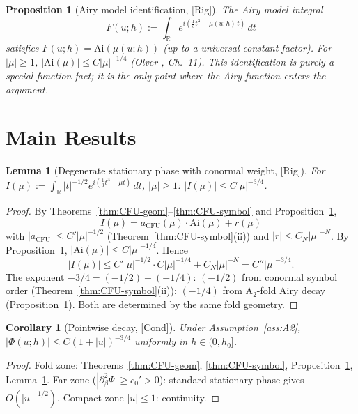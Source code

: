 \documentclass[12pt,a4paper]{amsart}
\newtheorem{lemma}[theorem]{Lemma}
\newtheorem{proposition}[theorem]{Proposition}
\newtheorem{corollary}[theorem]{Corollary}
\theoremstyle{definition}
\theoremstyle{remark}
\newcommand{\Rig}{\textup{[Rig]}}
\newcommand{\Cond}{\textup{[Cond]}}
\begin{document}
\begin{proposition}[Airy model identification, \Rig]
\label{prop:airy-id}
The Airy model integral
\[
  F(u;h) :=
  \int_\mathbb{R}
  e^{i(\frac{1}{3}t^3-\mu(u;h)\,t)}
  \,dt
\]
satisfies $F(u;h)=\mathrm{Ai}(\mu(u;h))$
(up to a universal constant factor).
For $|\mu|\ge 1$,
$|\mathrm{Ai}(\mu)|\le C|\mu|^{-1/4}$
(Olver \cite{Olver1974}, Ch.~11).
This identification is purely a special function fact;
it is the only point where the Airy function enters
the argument.
\end{proposition}

\section{Main Results}
\label{sec:results}

\begin{lemma}[Degenerate stationary phase
  with conormal weight, \Rig]
\label{lem:degenerate-phase}
For $I(\mu):=\int_\mathbb{R}|t|^{-1/2}
e^{i(\frac{1}{3}t^3-\mu t)}\,dt$,
$|\mu|\ge 1$:
$|I(\mu)|\le C|\mu|^{-3/4}$.
\end{lemma}

\begin{proof}
By Theorems~\ref{thm:CFU-geom}--\ref{thm:CFU-symbol}
and Proposition~\ref{prop:airy-id},
\[
  I(\mu) = a_{\mathrm{CFU}}(\mu)\cdot\mathrm{Ai}(\mu) + r(\mu)
\]
with $|a_{\mathrm{CFU}}|\le C'|\mu|^{-1/2}$
(Theorem~\ref{thm:CFU-symbol}(ii))
and $|r|\le C_N|\mu|^{-N}$.
By Proposition~\ref{prop:airy-id},
$|\mathrm{Ai}(\mu)|\le C|\mu|^{-1/4}$.
Hence
\[
  |I(\mu)|
  \le C'|\mu|^{-1/2}\cdot C|\mu|^{-1/4}
  + C_N|\mu|^{-N}
  = C''|\mu|^{-3/4}.
\]
The exponent $-3/4=(-1/2)+(-1/4)$:
$(-1/2)$ from conormal symbol order
(Theorem~\ref{thm:CFU-symbol}(ii));
$(-1/4)$ from A$_2$-fold Airy decay
(Proposition~\ref{prop:airy-id}).
Both are determined by the same fold geometry.
\end{proof}

\begin{corollary}[Pointwise decay, \Cond]
\label{cor:pointwise}
Under Assumption~\ref{ass:A2},
$|\Phi(u;h)|\le C(1+|u|)^{-3/4}$
uniformly in $h\in(0,h_0]$.
\end{corollary}

\begin{proof}
Fold zone: Theorems~\ref{thm:CFU-geom},
\ref{thm:CFU-symbol},
Proposition~\ref{prop:airy-id},
Lemma~\ref{lem:degenerate-phase}.
Far zone ($|\partial_\beta^2\Psi|\ge c_0'>0$):
standard stationary phase gives $O(|u|^{-1/2})$.
Compact zone $|u|\le 1$: continuity.
\end{proof}
\end{document}
